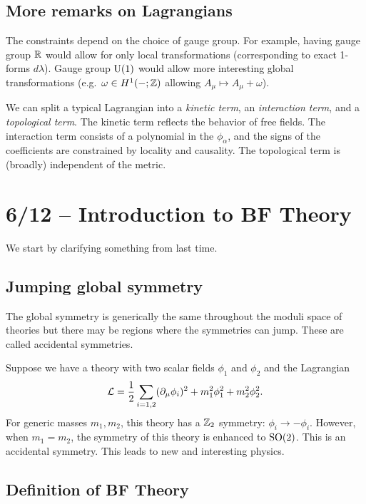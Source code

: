 \subsection{More remarks on Lagrangians}

The constraints depend on the choice of gauge group.
For example, having gauge group $\mathbb{R}$ would allow for only local transformations (corresponding to exact 1-forms $d \lambda$).
Gauge group $\mathrm{U}(1)$ would allow more interesting global transformations (e.g.\ $\omega \in H^1(-; \mathbb{Z})$ allowing $A_\mu \mapsto A_\mu + \omega$).

We can split a typical Lagrangian into a \emph{kinetic term}, an \emph{interaction term}, and a \emph{topological term}.
The kinetic term reflects the behavior of free fields.
The interaction term consists of a polynomial in the $\phi_\alpha$, and the signs of the coefficients are constrained by locality and causality.
The topological term is (broadly) independent of the metric.

\section{6/12 -- Introduction to BF Theory}

We start by clarifying something from last time.

\subsection{Jumping global symmetry}

The global symmetry is generically the same throughout the moduli space of theories but there may be regions where the symmetries can jump. These are called accidental symmetries.

\begin{ex}
	Suppose we have a theory with two scalar fields $\phi_1$ and $\phi_2$ and the Lagrangian
	\[
		\mathcal{L} = \frac{1}{2} \sum_{i=1,2} (\partial_\mu \phi_i)^2 + m_1^2 \phi_1^2 + m_2^2 \phi_2^2.
	\]
	For generic masses $m_1, m_2$, this theory has a $\mathbb{Z}_2$ symmetry: $\phi_i \to - \phi_i$. However, when $m_1 = m_2$, the symmetry of this theory is enhanced to $\mathrm{SO}(2)$. This is an accidental symmetry. This leads to new and interesting physics.
\end{ex}

\subsection{Definition of BF Theory}

